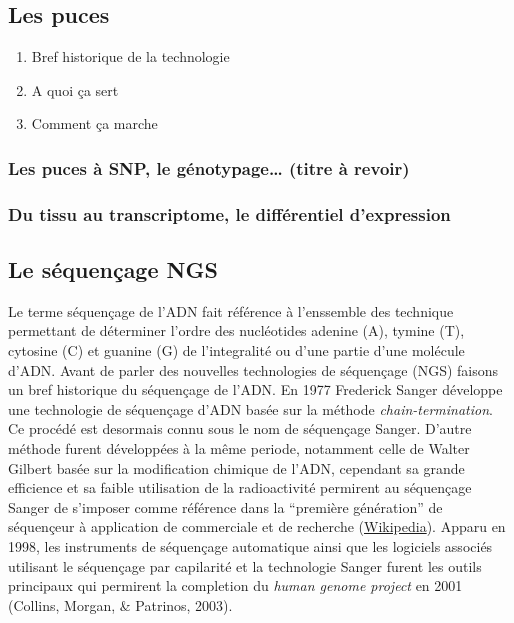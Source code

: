 \documentclass[12pt,twoside]{reedthesis}
\providecommand{\tightlist}{%
  \setlength{\itemsep}{0pt}\setlength{\parskip}{0pt}}
\theoremstyle{definition}
\theoremstyle{definition}
\theoremstyle{remark}
\begin{document}
  \subsection{Les puces}\label{les-puces}
  
  \begin{enumerate}
  \def\labelenumi{\arabic{enumi}.}
  \tightlist
  \item
    Bref historique de la technologie\\
  \item
    A quoi ça sert
  \item
    Comment ça marche
  \end{enumerate}
  
  \subsubsection{Les puces à SNP, le génotypage\ldots{} (titre à
  revoir)}\label{les-puces-a-snp-le-genotypage-titre-a-revoir}
  
  \subsubsection{Du tissu au transcriptome, le différentiel
  d'expression}\label{du-tissu-au-transcriptome-le-differentiel-dexpression}
  
  \subsection{Le séquençage NGS}\label{le-sequencage-ngs}
  
  Le terme séquençage de l'ADN fait référence à l'enssemble des technique
  permettant de déterminer l'ordre des nucléotides adenine (A), tymine
  (T), cytosine (C) et guanine (G) de l'integralité ou d'une partie d'une
  molécule d'ADN. Avant de parler des nouvelles technologies de séquençage
  (NGS) faisons un bref historique du séquençage de l'ADN. En 1977
  Frederick Sanger développe une technologie de séquençage d'ADN basée sur
  la méthode \emph{chain-termination}. Ce procédé est desormais connu sous
  le nom de séquençage Sanger. D'autre méthode furent développées à la
  même periode, notamment celle de Walter Gilbert basée sur la
  modification chimique de l'ADN, cependant sa grande efficience et sa
  faible utilisation de la radioactivité permirent au séquençage Sanger de
  s'imposer comme référence dans la ``première génération'' de séquençeur
  à application de commerciale et de recherche
  (\href{http://en.wikipedia.org/wiki/DNA_sequencing}{Wikipedia}). Apparu
  en 1998, les instruments de séquençage automatique ainsi que les
  logiciels associés utilisant le séquençage par capilarité et la
  technologie Sanger furent les outils principaux qui permirent la
  completion du \emph{human genome project} en 2001 (Collins, Morgan, \&
  Patrinos, 2003).
  
\end{document}
